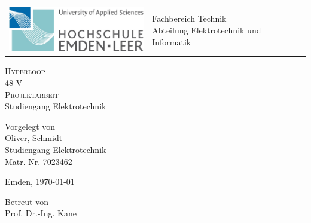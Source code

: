 \begin{titlepage}

	\vspace{-0.5cm}
	\hspace{-3.0cm}
	\begin{tabular}{p{8.0cm} p{8.0cm}}
		\includegraphics[width = 6.0cm]{img/GUI/hsel-allgemein} &
		\parbox[b]{8.0cm}{
		{\large 	Fachbereich Technik }                            \\
		{\large 	Abteilung Elektrotechnik und Informatik }
		}                                                         \\
		\\
		\hline
	\end{tabular}
	\begin{center}

		\vspace{2.5cm}
		\LARGE{\textsc{
				Hyperloop\\
				48 V
			}}\\

		\vspace{2.5cm}
		\LARGE{\textsc{
				{Projektarbeit}
			}}\\
		\large
		Studiengang Elektrotechnik

		\vspace{2cm}%
		\large
		Vorgelegt von\\ Oliver, Schmidt\\ Studiengang Elektrotechnik\\ Matr. Nr. 7023462

		\vspace{1cm}
		Emden, \today

		\vspace{3.5cm}%
		Betreut von\\ Prof. Dr.-Ing. Kane

	\end{center}
	\normalsize
\end{titlepage}
